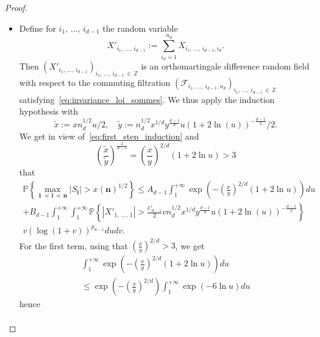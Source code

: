 \documentclass[AHL,Unicode,longabstracts,published]{cedram}
\newcommand{\Fca}{\mathcal{F}}
\newcommand\PP{\mathbb{P}}
\newcommand\Z{\mathbb{Z}}
\newcommand{\pr}[1]{(#1)}
\newcommand{\gr}[1]{\bm{#1}}
\newcommand{\gri}{\bm{i}}
\newcommand{\grn}{\bm{n}}
\newcommand{\imd}{\preccurlyeq}
\begin{document}
\begin{proof}
\begin{itemize}
\begin{multline}
\PP\left\{\max_{\gr{1}\,\imd\,\gri\,\imd\,\gr{n}} \left|S_{\gri} \right| >x\left|\grn\right|^{1/2}\right\} \\
\leq\int_1^{+\infty}
\PP\left\{
\max_{1\,\leq\,i_q\,\leq\,n_q,\,1\,\leq \,q\,\leq\,d-1}
\left|S_{i_1,\,\dots,\,i_{d-1},\,n_d}\right|>x\left|\grn\right|^{1/2}u/2 \right\}du.
\end{multline}
\item[\eqref{step2}] Define for $i_1,\,\dots,\,i_{d-1}$ the random variable
\begin{equation}
X'_{i_1,\,\dots,\,i_{d-1}}:=
\sum_{i_d=1}^{n_d}X_{i_1,\,\dots,\,i_{d-1},i_d}.
\end{equation}
Then $\pr{X'_{i_1,\,\dots,\,i_{d-1}}}_{i_1,\,\dots,\,i_{d-1}\,\in\,\Z}$ is an orthomartingale difference random field with respect to the commuting filtration $\pr{\Fca_{i_1,\,\dots,\,i_{d-1},n_d}}_{i_1,\,\dots,\,i_{d-1}\,\in\,\Z}$ satisfying~\eqref{eq:invariance_loi_sommes}. We thus apply the induction hypothesis with
\begin{equation}
\widetilde{x}:= xn_d^{1/2}u/2, \quad \widetilde{y}:= n_d^{1/2}x^{ 1/d}y^{\frac{d-1}d}u
\left(1+2\ln\pr{ u}\right)^{-\frac{d-1}2}/2.
\end{equation}
We get in view of~\eqref{eq:first_step_induction} and
\begin{equation}
\left(\frac{\widetilde{x}}{\widetilde{y}}\right)^{\frac{2}{d-1}}=
\left(\frac xy\right)^{2/d}\left(1+2\ln u\right)>3
\end{equation}
that
\begin{multline}\label{eq:second_step_induction}
\PP\left\{\max_{\gr{1}\,\imd\,\gri\,\imd\,\gr{n}} \left|S_{\gri}\right| >x\left(\grn\right)^{1/2}\right\} \leq A_{d-1}\int_1^{+\infty}\exp\left(-\left(\frac xy\right)^{2/d}\left(1+2\ln u\right)\right)du\\+ B_{d-1}\int_1^{+\infty}\int_1^{+\infty}\PP\left\{
\left|X'_{1,\,\dots,\,1}\right|>\frac{C_{d-1}}2vn_d^{1/2}x^{1/d}y^{\frac{d-1}d}u
\left(1+2\ln\pr{ u}\right)^{-\frac{d-1}2}\right\}\\
v\left(\log\pr{1+v}\right)^{p_{d-1}}dudv.
\end{multline}
For the first term, using that $ \pr{\frac xy}^{2/d}>3$, we get
\begin{multline}
\int_1^{+\infty}\exp\left(-\left(\frac xy\right)^{2/d}\left(1+2\ln u\right)\right)du
\\
\leq \exp\left(-\left(\frac xy\right)^{2/d}\right)
\int_1^{+\infty}\exp\left(-6\ln u\right)du
\end{multline}
hence
\begin{multline}\label{eq:second_step_induction_final}

\end{multline}
\end{itemize}
\end{proof}
\end{document}
